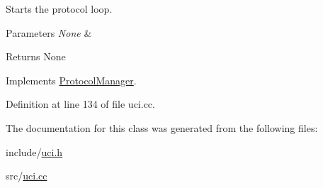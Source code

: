 Starts the protocol loop. 


\begin{DoxyParams}{Parameters}
{\em None} & \\
\hline
\end{DoxyParams}
\begin{DoxyReturn}{Returns}
None 
\end{DoxyReturn}


Implements \mbox{\hyperlink{classProtocolManager_aa3ae25a03e2f070ea486fd9319715a6a}{Protocol\+Manager}}.



Definition at line 134 of file uci.\+cc.



The documentation for this class was generated from the following files\+:\begin{DoxyCompactItemize}
\item 
include/\mbox{\hyperlink{uci_8h}{uci.\+h}}\item 
src/\mbox{\hyperlink{uci_8cc}{uci.\+cc}}\end{DoxyCompactItemize}
